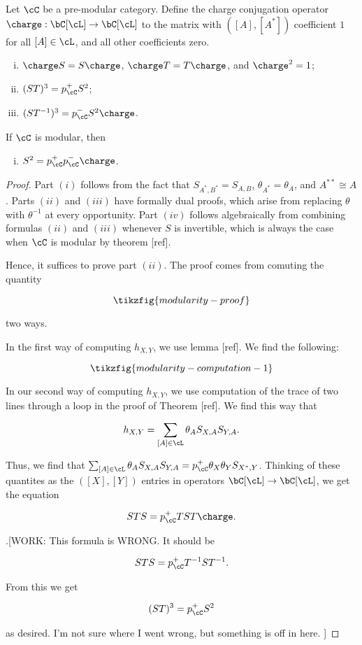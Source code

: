 \begin{thrm} Let $\cC$ be a pre-modular category. Define the charge conjugation operator $\charge: \bC[\cL]\to \bC[\cL]$ to the matrix with $([A],[A^*])$ coefficient $1$ for all $[A]\in \cL$, and all other coefficients zero.

\begin{enumerate}[(i)]
\item $\charge S = S \charge$, $\charge T = T \charge$, and $\charge ^2 =1$;
\item $(ST)^3=p^{+}_{\cC}S^2$;
\item $(S T^{-1})^3 = p^{-}_{\cC}S^2 \charge$.
\end{enumerate}

If $\cC$ is modular, then

\begin{enumerate}[(iv)]
\item $S^2= p^{+}_{\cC}p^{-}_{\cC}\charge$.
\end{enumerate}

\end{thrm}
\begin{proof} Part $(i)$ follows from the fact that $S_{A^*,B^*}=S_{A,B}$, $\theta_{A^*}=\theta_A$, and $A^{**}\cong A$. Parts $(ii)$ and $(iii)$ have formally dual proofs, which arise from replacing $\theta$ with $\theta^{-1}$ at every opportunity. Part $(iv)$ follows algebraically from combining formulas $(ii)$ and $(iii)$ whenever $S$ is invertible, which is always the case when $\cC$ is modular by theorem [ref].

Hence, it suffices to prove part $(ii)$. The proof comes from comuting the quantity

\begin{equation*}
\tikzfig{modularity-proof}
\end{equation*}

two ways.

In the first way of computing $h_{X,Y}$, we use lemma [ref]. We find the following:

\begin{equation*}
\tikzfig{modularity-computation-1}
\end{equation*}

In our second way of computing $h_{X,Y}$, we use computation of the trace of two lines through a loop in the proof of Theorem [ref]. We find this way that

$$h_{X,Y}=\sum_{[A]\in \cL}\theta_{A}S_{X,A}S_{Y,A}.$$

Thus, we find that $\sum_{[A]\in \cL}\theta_{A}S_{X,A}S_{Y,A}=p_{\cC}^{+}\theta_{X}\theta_{Y}S_{X^*,Y}$. Thinking of these quantites as the $([X],[Y])$ entries in operators $\bC[\cL]\to\bC[\cL]$, we get the equation

$$STS=p_{\cC}^+ T S T \charge.$$

.[WORK: This formula is WRONG. It should be 

$$STS=p_{\cC}^+ T^{-1} S T^{-1}.$$

From this we get

$$(ST)^3 = p_{\cC}^{+}S^2$$

as desired. I'm not sure where I went wrong, but something is off in here.
]
\end{proof}


